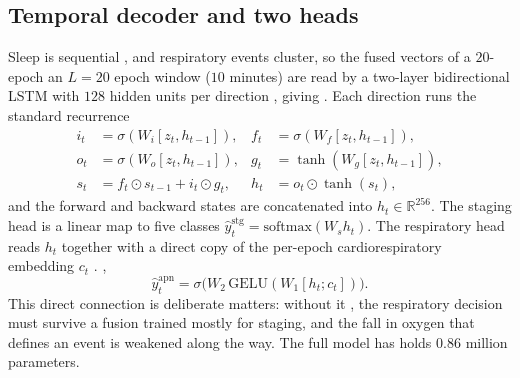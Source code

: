 \documentclass[journal]{IEEEtran}
\providecommand{\DIFaddtex}[1]{{\protect\color{blue} \sf #1}} %
\providecommand{\DIFdeltex}[1]{{\protect\color{red} \scriptsize #1}} %
\providecommand{\DIFaddbegin}{} %
\providecommand{\DIFaddend}{} %
\providecommand{\DIFdelbegin}{} %
\providecommand{\DIFdelend}{} %
\providecommand{\DIFadd}[1]{\texorpdfstring{\DIFaddtex{#1}}{#1}} %
\providecommand{\DIFdel}[1]{\texorpdfstring{\DIFdeltex{#1}}{}} %
\providecommand{\DIFscaledelfig}{0.5}
\newlength{\DIFdelgraphicswidth} %
\newlength{\DIFdelgraphicsheight} %
\providecommand{\DIFaddincludegraphics}[2][]{{\color{blue}\fbox{\DIFOincludegraphics[#1]{#2}}}} %
\providecommand{\DIFdelincludegraphics}[2][]{%
\sbox{\DIFdelgraphicsbox}{\DIFOincludegraphics[#1]{#2}}%
\settoboxwidth{\DIFdelgraphicswidth}{\DIFdelgraphicsbox} %
\settoboxtotalheight{\DIFdelgraphicsheight}{\DIFdelgraphicsbox} %
\scalebox{\DIFscaledelfig}{%
\parbox[b]{\DIFdelgraphicswidth}{\usebox{\DIFdelgraphicsbox}\\[-\baselineskip] \rule{\DIFdelgraphicswidth}{0em}}\llap{\resizebox{\DIFdelgraphicswidth}{\DIFdelgraphicsheight}{%
\setlength{\unitlength}{\DIFdelgraphicswidth}%
\begin{picture}(1,1)%
\thicklines\linethickness{2pt} %
{\color[rgb]{1,0,0}\put(0,0){\framebox(1,1){}}}%
{\color[rgb]{1,0,0}\put(0,0){\line( 1,1){1}}}%
{\color[rgb]{1,0,0}\put(0,1){\line(1,-1){1}}}%
\end{picture}%
}\hspace*{3pt}}} %
} %
\DeclareRobustCommand{\DIFaddbegin}{\DIFOaddbegin \let\includegraphics\DIFaddincludegraphics} %
\DeclareRobustCommand{\DIFaddend}{\DIFOaddend \let\includegraphics\DIFOincludegraphics} %
\DeclareRobustCommand{\DIFdelbegin}{\DIFOdelbegin \let\includegraphics\DIFdelincludegraphics} %
\DeclareRobustCommand{\DIFdelend}{\DIFOaddend \let\includegraphics\DIFOincludegraphics} %
\begin{document}
\subsection{Temporal decoder and two heads}
Sleep is sequential \DIFdelbegin \DIFdel{, }\DIFdelend and respiratory events cluster, so the fused vectors of \DIFdelbegin \DIFdel{a $20$-epoch
}\DIFdelend \DIFaddbegin \DIFadd{an $L=20$ epoch
}\DIFaddend window ($10$ minutes) are read by a two-layer bidirectional LSTM\DIFdelbegin \DIFdel{with $128$ hidden units per
direction , giving }\DIFdelend \DIFaddbegin \DIFadd{. Each direction runs the
standard recurrence
}\begin{align}
i_t&=\sigma(W_i[z_t,h_{t-1}]), & f_t&=\sigma(W_f[z_t,h_{t-1}]),\nonumber\\
o_t&=\sigma(W_o[z_t,h_{t-1}]), & g_t&=\tanh(W_g[z_t,h_{t-1}]),\\
s_t&=f_t\odot s_{t-1}+i_t\odot g_t, & h_t&=o_t\odot\tanh(s_t),\nonumber
\end{align}
\DIFadd{and the forward and backward states are concatenated into }\DIFaddend $h_t\in\mathbb{R}^{256}$. The
staging head is a linear map \DIFdelbegin \DIFdel{to five classes}\DIFdelend \DIFaddbegin \DIFadd{$\hat y^{\mathrm{stg}}_t=\mathrm{softmax}(W_s h_t)$}\DIFaddend . The
respiratory head reads $h_t$ together with a direct copy of the per-epoch cardiorespiratory
embedding $c_t$\DIFdelbegin \DIFdel{. }\DIFdelend \DIFaddbegin \DIFadd{,
}\begin{equation}
\hat y^{\mathrm{apn}}_t=\sigma\!\big(W_2\,\mathrm{GELU}(W_1[h_t;c_t])\big).
\end{equation}
\DIFaddend This direct connection \DIFdelbegin \DIFdel{is deliberate}\DIFdelend \DIFaddbegin \DIFadd{matters}\DIFaddend : without it \DIFdelbegin \DIFdel{, }\DIFdelend the respiratory decision must survive a fusion
trained mostly for staging, and the fall in oxygen that defines an event is weakened along the
way. The full model \DIFdelbegin \DIFdel{has }\DIFdelend \DIFaddbegin \DIFadd{holds }\DIFaddend $0.86$ million parameters.
\end{document}
